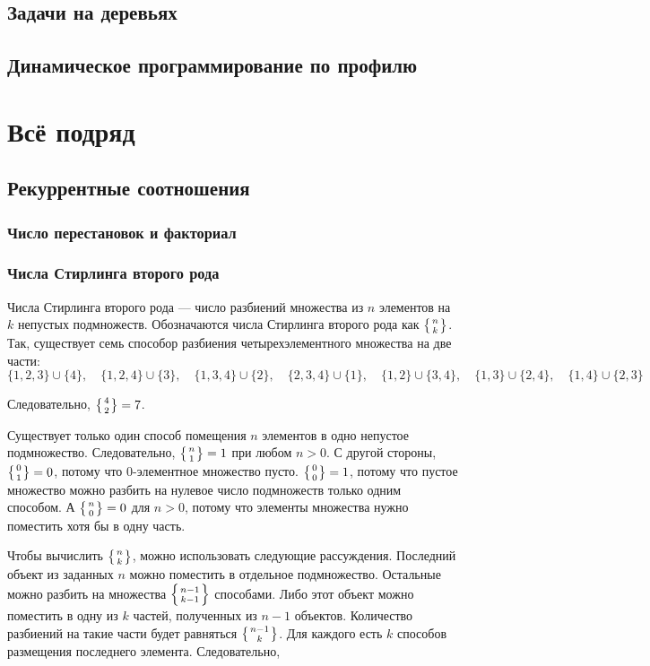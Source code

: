 \documentclass[14pt,openany]{book}
\begin{document}
\chapter{Задачи на деревьях}

\chapter{Динамическое программирование по профилю}

\part{Всё подряд}

\chapter{Рекуррентные соотношения}



\section{Число перестановок и факториал}

\section{Числа Стирлинга второго рода}

Числа Стирлинга второго рода --- число разбиений множества из $n$ элементов на $k$
непустых подмножеств. Обозначаются числа Стирлинга второго рода как $\left\{{n}\atop{k}\right\}$.
Так, существует семь способор разбиения четырехэлементного множества на две части:
$$
  \{1,2,3\}\cup\{4\}, \quad \{1,2,4\}\cup\{3\}, \quad \{1,3,4\}\cup\{2\}, \quad \{2,3,4\}\cup\{1\},
  \quad \{1,2\}\cup\{3,4\}, \quad \{1,3\}\cup\{2,4\}, \quad \{1,4\}\cup\{2,3\}
$$

Следовательно, $\left\{{4}\atop{2}\right\} = 7$.

Существует только один способ помещения $n$ элементов в одно непустое подмножество.
Следовательно, $\left\{{n}\atop{1}\right\} = 1$ при любом $n>0$. С другой стороны, $\left\{{0}\atop{1}\right\} = 0$,
потому что $0$-элементное множество пусто. $\left\{{0}\atop{0}\right\} = 1$, потому что пустое множество
можно разбить на нулевое число подмножеств только одним способом. А $\left\{{n}\atop{0}\right\} = 0$ для
$n>0$, потому что элементы множества нужно поместить хотя бы в одну часть.

Чтобы вычислить $\left\{{n}\atop{k}\right\}$, можно использовать следующие рассуждения.
Последний объект из заданных $n$ можно поместить в отдельное подмножество. Остальные можно
разбить на множества $\left\{{n-1}\atop{k-1}\right\}$ способами. Либо этот объект можно поместить
в одну из $k$ частей, полученных из $n-1$ объектов. Количество разбиений на такие части
будет равняться $\left\{{n-1}\atop{k}\right\}$. Для каждого есть $k$ способов размещения последнего
элемента.
Следовательно,
\end{document}
